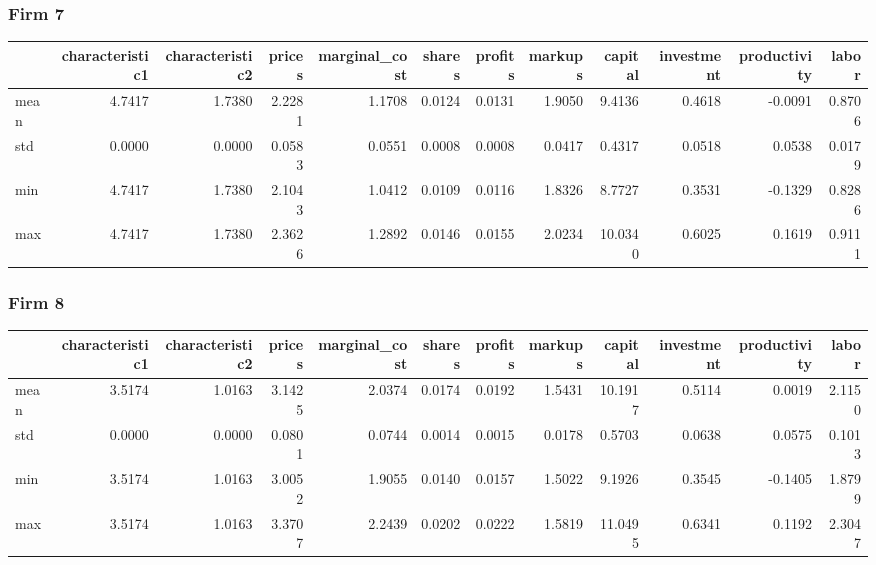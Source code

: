  \subsubsection*{Firm 7}
\begin{tabular}{lrrrrrrrrrrr}
\toprule
{} &  characteristic1 &  characteristic2 &  prices &  marginal\_cost &  shares &  profits &  markups &  capital &  investment &  productivity &  labor \\
\midrule
mean &           4.7417 &           1.7380 &  2.2281 &         1.1708 &  0.0124 &   0.0131 &   1.9050 &   9.4136 &      0.4618 &       -0.0091 & 0.8706 \\
std  &           0.0000 &           0.0000 &  0.0583 &         0.0551 &  0.0008 &   0.0008 &   0.0417 &   0.4317 &      0.0518 &        0.0538 & 0.0179 \\
min  &           4.7417 &           1.7380 &  2.1043 &         1.0412 &  0.0109 &   0.0116 &   1.8326 &   8.7727 &      0.3531 &       -0.1329 & 0.8286 \\
max  &           4.7417 &           1.7380 &  2.3626 &         1.2892 &  0.0146 &   0.0155 &   2.0234 &  10.0340 &      0.6025 &        0.1619 & 0.9111 \\
\bottomrule
\end{tabular}


 \subsubsection*{Firm 8}
\begin{tabular}{lrrrrrrrrrrr}
\toprule
{} &  characteristic1 &  characteristic2 &  prices &  marginal\_cost &  shares &  profits &  markups &  capital &  investment &  productivity &  labor \\
\midrule
mean &           3.5174 &           1.0163 &  3.1425 &         2.0374 &  0.0174 &   0.0192 &   1.5431 &  10.1917 &      0.5114 &        0.0019 & 2.1150 \\
std  &           0.0000 &           0.0000 &  0.0801 &         0.0744 &  0.0014 &   0.0015 &   0.0178 &   0.5703 &      0.0638 &        0.0575 & 0.1013 \\
min  &           3.5174 &           1.0163 &  3.0052 &         1.9055 &  0.0140 &   0.0157 &   1.5022 &   9.1926 &      0.3545 &       -0.1405 & 1.8799 \\
max  &           3.5174 &           1.0163 &  3.3707 &         2.2439 &  0.0202 &   0.0222 &   1.5819 &  11.0495 &      0.6341 &        0.1192 & 2.3047 \\
\bottomrule
\end{tabular}


